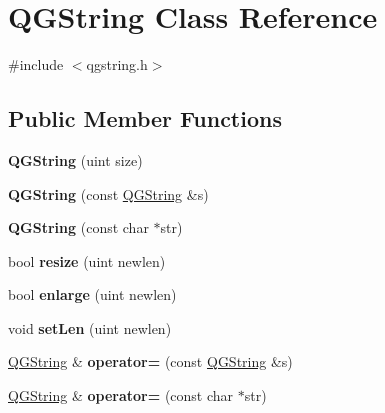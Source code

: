 \hypertarget{class_q_g_string}{}\section{Q\+G\+String Class Reference}
\label{class_q_g_string}


{\ttfamily \#include $<$qgstring.\+h$>$}

\subsection*{Public Member Functions}
\begin{DoxyCompactItemize}
\item 
\mbox{\label{class_q_g_string_a4b7f1d7d9196ee284e8613daa3f2e7b4}} 
{\bfseries Q\+G\+String} (uint size)
\item 
\mbox{\label{class_q_g_string_a100431601206d32a3f272375213c7629}} 
{\bfseries Q\+G\+String} (const \mbox{\hyperlink{class_q_g_string}{Q\+G\+String}} \&s)
\item 
\mbox{\label{class_q_g_string_ac070cab1f8a7e40fb779adb925b63d10}} 
{\bfseries Q\+G\+String} (const char $\ast$str)
\item 
\mbox{\label{class_q_g_string_a6263402a34882078f7f2962d3b1ca13d}} 
bool {\bfseries resize} (uint newlen)
\item 
\mbox{\label{class_q_g_string_a099adb917ca8294e71bea0b86ef32857}} 
bool {\bfseries enlarge} (uint newlen)
\item 
\mbox{\label{class_q_g_string_a892704e70f3b99e36126eccf042a25fa}} 
void {\bfseries set\+Len} (uint newlen)
\item 
\mbox{\label{class_q_g_string_a171c21ad69a00411e592e386ad4f8852}} 
\mbox{\hyperlink{class_q_g_string}{Q\+G\+String}} \& {\bfseries operator=} (const \mbox{\hyperlink{class_q_g_string}{Q\+G\+String}} \&s)
\item 
\mbox{\label{class_q_g_string_ade199d24293874d40038ba9ff3a5394b}} 
\mbox{\hyperlink{class_q_g_string}{Q\+G\+String}} \& {\bfseries operator=} (const char $\ast$str)

\end{DoxyCompactItemize}
